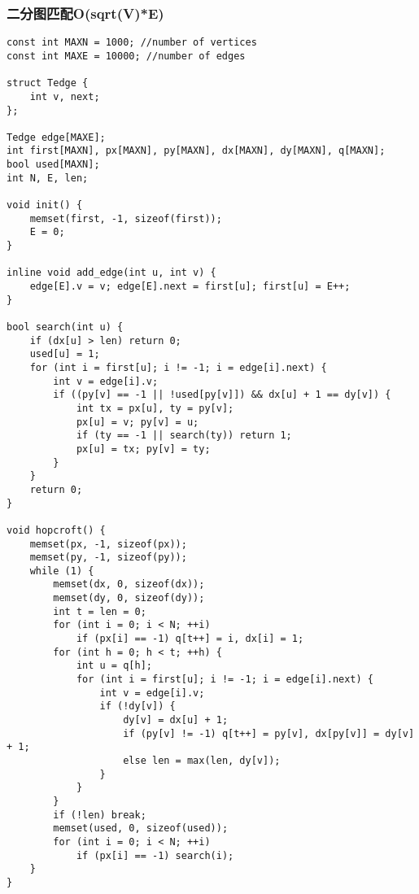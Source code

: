 \subsubsection{二分图匹配O(sqrt(V)*E)}
\begin{verbatim}
const int MAXN = 1000; //number of vertices
const int MAXE = 10000; //number of edges

struct Tedge {
    int v, next;
};

Tedge edge[MAXE];
int first[MAXN], px[MAXN], py[MAXN], dx[MAXN], dy[MAXN], q[MAXN];
bool used[MAXN];
int N, E, len;

void init() {
    memset(first, -1, sizeof(first));
    E = 0;
}

inline void add_edge(int u, int v) {
    edge[E].v = v; edge[E].next = first[u]; first[u] = E++;
}

bool search(int u) {
    if (dx[u] > len) return 0;
    used[u] = 1;
    for (int i = first[u]; i != -1; i = edge[i].next) {
        int v = edge[i].v;
        if ((py[v] == -1 || !used[py[v]]) && dx[u] + 1 == dy[v]) {
            int tx = px[u], ty = py[v];
            px[u] = v; py[v] = u;
            if (ty == -1 || search(ty)) return 1;
            px[u] = tx; py[v] = ty;
        }
    }
    return 0;
}

void hopcroft() {
    memset(px, -1, sizeof(px));
    memset(py, -1, sizeof(py));
    while (1) {
        memset(dx, 0, sizeof(dx));
        memset(dy, 0, sizeof(dy));
        int t = len = 0;
        for (int i = 0; i < N; ++i)
            if (px[i] == -1) q[t++] = i, dx[i] = 1;
        for (int h = 0; h < t; ++h) {
            int u = q[h];
            for (int i = first[u]; i != -1; i = edge[i].next) {
                int v = edge[i].v;
                if (!dy[v]) {
                    dy[v] = dx[u] + 1;
                    if (py[v] != -1) q[t++] = py[v], dx[py[v]] = dy[v] + 1;
                    else len = max(len, dy[v]);
                }
            }
        }
        if (!len) break;
        memset(used, 0, sizeof(used));
        for (int i = 0; i < N; ++i)
            if (px[i] == -1) search(i);
    }
}
\end{verbatim}
